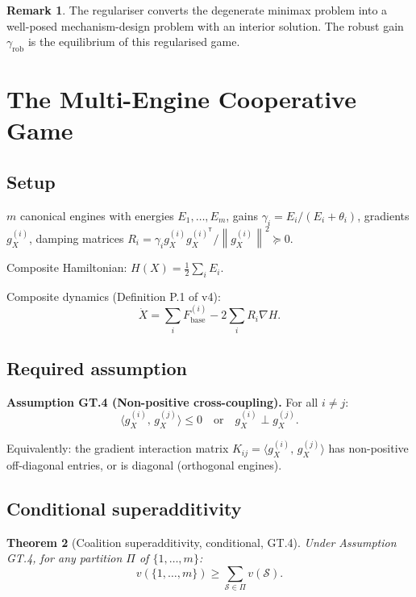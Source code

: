 \documentclass[11pt,a4paper]{article}
\newtheorem{theorem}{Theorem}[section]
\theoremstyle{definition}
\newtheorem{remark}[theorem]{Remark}
\newcommand{\T}{^{\mathsf{T}}}
\newcommand{\norm}[1]{\left\|#1\right\|}
\newcommand{\inner}[2]{\langle #1,\,#2\rangle}
\newcommand{\Fbase}{F_{\mathrm{base}}}
\newcommand{\half}{\tfrac{1}{2}}
\newcommand{\rob}{\mathrm{rob}}
\begin{document}
\begin{remark}
The regulariser converts the degenerate minimax problem into a well-posed mechanism-design problem
with an interior solution. The robust gain $\gamma_\rob$ is the equilibrium of this regularised game.
\end{remark}

\section{The Multi-Engine Cooperative Game}

\subsection{Setup}

$m$ canonical engines with energies $E_1,\dots,E_m$, gains $\gamma_i = E_i/(E_i+\theta_i)$,
gradients $g_X^{(i)}$, damping matrices $R_i = \gamma_i g_X^{(i)}g_X^{(i)\T}/\norm{g_X^{(i)}}^2 \succeq 0$.

Composite Hamiltonian: $H(X) = \half\sum_i E_i$.

Composite dynamics (Definition P.1 of v4):
\[
\dot X = \sum_i \Fbase^{(i)} - 2\sum_i R_i\nabla H.
\]

\subsection{Required assumption}

\begin{lockedbox}
\textbf{Assumption GT.4 (Non-positive cross-coupling).}
For all $i \neq j$:
\[
\inner{g_X^{(i)}}{g_X^{(j)}} \leq 0
\quad\text{or}\quad
g_X^{(i)} \perp g_X^{(j)}.
\]
\end{lockedbox}

Equivalently: the gradient interaction matrix $K_{ij} = \inner{g_X^{(i)}}{g_X^{(j)}}$
has non-positive off-diagonal entries, or is diagonal (orthogonal engines).

\subsection{Conditional superadditivity}

\begin{theorem}[Coalition superadditivity, conditional, GT.4]
\emph{Under Assumption GT.4}, for any partition $\Pi$ of $\{1,\dots,m\}$:
\[
v(\{1,\dots,m\}) \geq \sum_{\mathcal{S}\in\Pi} v(\mathcal{S}).
\]
\end{theorem}
\end{document}
